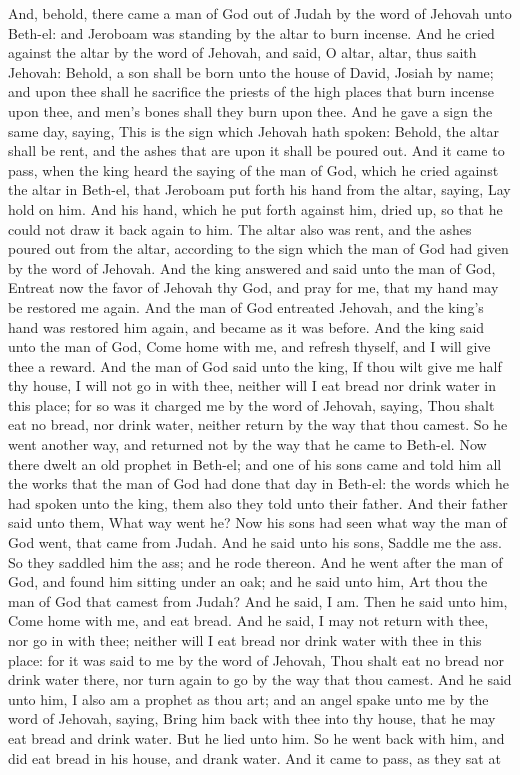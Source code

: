 And, behold, there came a man of God out of Judah by the word of Jehovah unto Beth-el: and Jeroboam was standing by the altar to burn incense. And he cried against the altar by the word of Jehovah, and said, O altar, altar, thus saith Jehovah: Behold, a son shall be born unto the house of David, Josiah by name; and upon thee shall he sacrifice the priests of the high places that burn incense upon thee, and men’s bones shall they burn upon thee. And he gave a sign the same day, saying, This is the sign which Jehovah hath spoken: Behold, the altar shall be rent, and the ashes that are upon it shall be poured out. And it came to pass, when the king heard the saying of the man of God, which he cried against the altar in Beth-el, that Jeroboam put forth his hand from the altar, saying, Lay hold on him. And his hand, which he put forth against him, dried up, so that he could not draw it back again to him. The altar also was rent, and the ashes poured out from the altar, according to the sign which the man of God had given by the word of Jehovah. And the king answered and said unto the man of God, Entreat now the favor of Jehovah thy God, and pray for me, that my hand may be restored me again. And the man of God entreated Jehovah, and the king’s hand was restored him again, and became as it was before. And the king said unto the man of God, Come home with me, and refresh thyself, and I will give thee a reward. And the man of God said unto the king, If thou wilt give me half thy house, I will not go in with thee, neither will I eat bread nor drink water in this place; for so was it charged me by the word of Jehovah, saying, Thou shalt eat no bread, nor drink water, neither return by the way that thou camest. So he went another way, and returned not by the way that he came to Beth-el.  Now there dwelt an old prophet in Beth-el; and one of his sons came and told him all the works that the man of God had done that day in Beth-el: the words which he had spoken unto the king, them also they told unto their father. And their father said unto them, What way went he? Now his sons had seen what way the man of God went, that came from Judah. And he said unto his sons, Saddle me the ass. So they saddled him the ass; and he rode thereon. And he went after the man of God, and found him sitting under an oak; and he said unto him, Art thou the man of God that camest from Judah? And he said, I am. Then he said unto him, Come home with me, and eat bread. And he said, I may not return with thee, nor go in with thee; neither will I eat bread nor drink water with thee in this place: for it was said to me by the word of Jehovah, Thou shalt eat no bread nor drink water there, nor turn again to go by the way that thou camest. And he said unto him, I also am a prophet as thou art; and an angel spake unto me by the word of Jehovah, saying, Bring him back with thee into thy house, that he may eat bread and drink water. But he lied unto him. So he went back with him, and did eat bread in his house, and drank water.  And it came to pass, as they sat at 